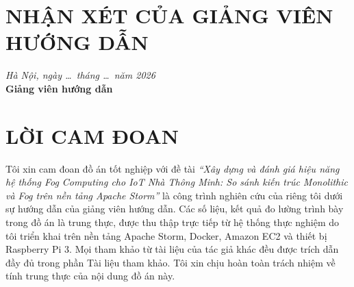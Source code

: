 \documentclass[13pt,a4paper]{report}
\begin{document}

\chapter*{NHẬN XÉT CỦA GIẢNG VIÊN HƯỚNG DẪN}
\thispagestyle{plain}
\vspace{1em}
\noindent\dotfill\par\vspace{1.4em}
\noindent\dotfill\par\vspace{1.4em}
\noindent\dotfill\par\vspace{1.4em}
\noindent\dotfill\par\vspace{1.4em}
\noindent\dotfill\par\vspace{1.4em}
\noindent\dotfill\par\vspace{1.4em}
\noindent\dotfill\par\vspace{1.4em}
\noindent\dotfill\par
\vspace{2.5em}
\begin{flushright}
\textit{Hà Nội, ngày \dots\ tháng \dots\ năm 2026}\\[0.4em]
\textbf{Giảng viên hướng dẫn}\\[3.2em]
\dotfill
\end{flushright}

\chapter*{LỜI CAM ĐOAN}
\thispagestyle{plain}
Tôi xin cam đoan đồ án tốt nghiệp với đề tài \textit{``Xây dựng và đánh giá
hiệu năng hệ thống Fog Computing cho IoT Nhà Thông Minh: So sánh kiến trúc
Monolithic và Fog trên nền tảng Apache Storm''} là công trình nghiên cứu của
riêng tôi dưới sự hướng dẫn của giảng viên hướng dẫn. Các số liệu, kết quả đo
lường trình bày trong đồ án là trung thực, được thu thập trực tiếp từ hệ thống
thực nghiệm do tôi triển khai trên nền tảng Apache Storm, Docker, Amazon EC2 và
thiết bị Raspberry Pi 3. Mọi tham khảo từ tài liệu của tác giả khác đều được
trích dẫn đầy đủ trong phần Tài liệu tham khảo. Tôi xin chịu hoàn toàn trách
nhiệm về tính trung thực của nội dung đồ án này.
\end{document}
